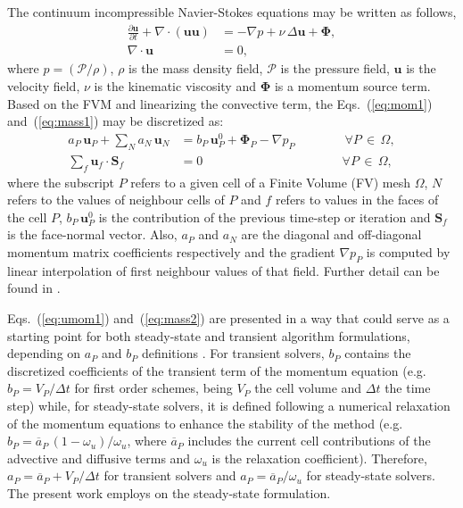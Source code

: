 \documentclass[final,3p,times,11pt,onecolumn]{myElsarticle}
\numberwithin{equation}{section}
\begin{document}
The continuum incompressible Navier-Stokes equations may be written as follows,
\begin{align}
\displaystyle \frac{\partial \boldsymbol{u}}{\partial t} + \nabla \cdotp (\boldsymbol{u} \boldsymbol{u}) &= -\nabla p + \nu\, \Delta \boldsymbol{u} + \boldsymbol{\Phi},
\label{eq:mom1}
\\
\displaystyle \nabla \cdotp \boldsymbol{u} &= 0, 
\label{eq:mass1}
\end{align}
\noindent where $\displaystyle p = (\mathcal{P}/\rho)$, $\rho$ is the mass density field, $\mathcal{P}$ is the pressure field, $\boldsymbol{u}$ is the velocity field, $\nu$ is the kinematic viscosity and $\mathbf{\Phi}$ is a momentum source term.
Based on the FVM and linearizing the convective term, the Eqs.~(\ref{eq:mom1}) and~(\ref{eq:mass1}) may be discretized as:
\begin{align}
a_P\,\boldsymbol{u}_P + \sum_{N} a_{N}\,\boldsymbol{u}_{N} &= b_P\, \boldsymbol{u}^0_P + \boldsymbol{\Phi}_P - \nabla p_P
\qquad \qquad \forall P\,\in\,\Omega,
\label{eq:umom1}
\\
\sum_{f} \boldsymbol{u}_{f} \cdotp \textbf{S}_{f} &= 0
\qquad \qquad \qquad
\qquad \qquad \,\quad \forall P\,\in\,\Omega, 
\label{eq:mass2} 
\end{align}
where the subscript $P$ refers to a given cell of a Finite Volume (FV) mesh $\Omega$, $N$ refers to the values of neighbour cells of $P$ and $f$ refers to values in the faces of the cell $P$, $b_P\, \boldsymbol{u}^0_P$ is the contribution of the previous time-step or iteration and $\textbf{S}_{f}$ is the face-normal vector. Also, $a_P$ and $a_{N}$ are the diagonal and off-diagonal momentum matrix coefficients respectively and the gradient $\nabla p_P$ is computed by linear interpolation of first neighbour values of that field. Further detail can be found in \cite{jasak, moukalled, marquez}.

Eqs.~(\ref{eq:umom1}) and~(\ref{eq:mass2}) are presented in a way that could serve as a starting point for both steady-state and transient algorithm formulations, depending on $a_P$ and $b_P$ definitions \cite{issa2}. For transient solvers, $b_P$ contains the discretized coefficients of the transient term of the momentum equation (e.g. $b_P = V_P/\Delta t$ for first order schemes, being $V_P$ the cell volume and $\Delta t$ the time step) while, for steady-state solvers, it is defined following a numerical relaxation of the momentum equations to enhance the stability of the method \cite{moukalled} (e.g. $b_P = \overline{a}_P\,(1-\omega_u)/\omega_u $, where $\overline{a}_P$ includes the current cell contributions of the advective and diffusive terms and $\omega_u$ is the relaxation coefficient). Therefore, $a_P = \overline{a}_P + V_P/\Delta t$ for transient solvers and $a_P = \overline{a}_P/\omega_u$ for steady-state solvers.  The present work employs on the steady-state formulation.
\end{document}
